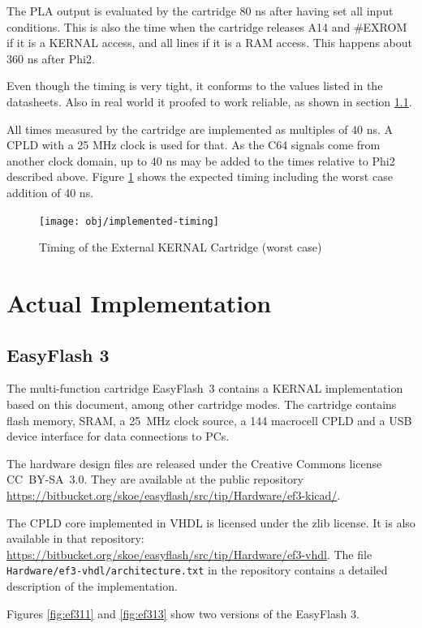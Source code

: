 \documentclass[a4paper,oneside]{memoir}
\begin{document}
The PLA output is evaluated by the cartridge 80 ns after having set all input conditions.
This is also the time when the cartridge releases A14 and \#EXROM if it is a KERNAL access, and all lines if it is a RAM access. This happens about 360 ns after Phi2.

Even though the timing is very tight, it conforms to the values listed in the datasheets.
Also in real world it proofed to work reliable, as shown in section \ref{sec:ef3}.

All times measured by the cartridge are implemented as multiples of 40 ns.
A CPLD with a 25 MHz clock is used for that.
As the C64 signals come from another clock domain, up to 40 ns may be added to the times relative to Phi2 described above.
Figure \ref {fig:timing} shows the expected timing including the worst case addition of 40 ns.

\begin{figure}[!hb]
    \centering
    \texttt{[image: obj/implemented-timing]}
    \caption{Timing of the External KERNAL Cartridge (worst case)}
    \label{fig:timing}
\end{figure}

\chapter{Actual Implementation}

\section{EasyFlash 3}

\label{sec:ef3} The multi-function cartridge EasyFlash~3 contains a KERNAL implementation based on this document, among other cartridge modes.
The cartridge contains flash memory, SRAM, a 25~MHz clock source, a 144 macrocell CPLD and a USB device interface for data connections to PCs.

The hardware design files are released under the Creative Commons license CC~BY-SA~3.0.
They are available at the public repository
\url{https://bitbucket.org/skoe/easyflash/src/tip/Hardware/ef3-kicad/}.

The CPLD core implemented in VHDL is licensed under the zlib license.
It is also available in that repository:
\url{https://bitbucket.org/skoe/easyflash/src/tip/Hardware/ef3-vhdl}.
The file \texttt{Hardware/ef3-vhdl/architecture.txt} in the repository contains a
detailed description of the implementation.

Figures \ref{fig:ef311} and \ref{fig:ef313} show two versions of the EasyFlash 3.
\end{document}
